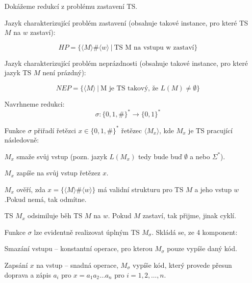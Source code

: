 \begin{compactitem}
    \item Dokážeme redukcí z problému zastavení TS.

    \item Jazyk charakterizující problém zastavení (obsahuje takové instance, pro které TS $M$ na $w$ zastaví):

    $$ HP = \{ \langle M \rangle \# \langle w \rangle ~|~ \text{TS M na vstupu w zastaví} \} $$

    \item Jazyk charakterizující problém neprázdnosti (obsahuje takové instance, pro které jazyk TS $M$ není prázdný):

    $$ NEP = \{ \langle M \rangle ~|~ \text{M je TS takový, že } L(M) \not= \emptyset \} $$

    \item Navrhneme redukci: $$\sigma : \{ 0, 1, \# \}^* \rightarrow \{ 0, 1 \}^*$$

    \item Funkce $\sigma$ přiřadí řetězci $x \in \{ 0, 1, \# \}^*$ řetězec $\langle M_x \rangle$, kde $M_x$ je TS pracující následovně: \begin{compactitem}
        \item $M_x$ smaže svůj vstup (pozn. jazyk $L(M_x)$ tedy bude buď $\emptyset$ a nebo $\Sigma^*$).

        \item $M_x$ zapíše na svůj vstup řetězez $x$.

        \item $M_x$ ověří, zda $x = \{ \langle M \rangle \# \langle w \rangle \}$ má validní strukturu pro TS $M$ a jeho vstup $w$.Pokud nemá, tak odmítne.

        \item TS $M_x$ odsimiluje běh TS $M$ na $w$. Pokud $M$ zastaví, tak přijme, jinak cyklí.
    \end{compactitem}

    \item Funkce $\sigma$ lze evidentně realizovat úplným TS $M_{\sigma}$. Skládá se, ze 4 komponent: \begin{compactenum}
        \item Smazání vstupu -- konstantní operace, pro kterou $M_{\sigma}$ pouze vypíše daný kód.

        \item Zapsání $x$ na vstup -- snadná operace, $M_{\sigma}$ vypíše kód, který provede přesun doprava a zápis $a_i$ pro $x = a_1 a_2 \dots a_n$ pro $i=1, 2, \dots, n$.


\end{compactenum}
\end{compactitem}
